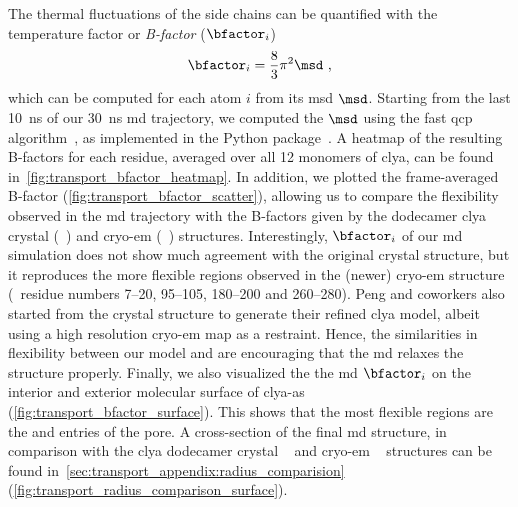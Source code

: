 The thermal fluctuations of the side chains can be quantified with the temperature factor or \emph{B-factor}
($\bfactor_i$)~\cite{Bahar-1997}
%
\begin{align}\label{eq:bfactor}
  \bfactor_i = \dfrac{8}{3} \pi^2 \msd \text{ ,}
\end{align}
%
which can be computed for each atom $i$ from its \gls{msd} $\msd$. Starting from the last \SI{10}{\ns} of our
\SI{30}{\ns} \gls{md} trajectory, we computed the $\msd$ using the fast \gls{qcp}
algorithm~\cite{Theobald-2005,Liu-2010}, as implemented in the  Python
package~\cite{MichaudAgrawal-2011}. A heatmap of the resulting B-factors for each residue, averaged over all
12 monomers of \gls{clya}, can be found in~\cref{fig:transport_bfactor_heatmap}. In addition, we plotted the
frame-averaged B-factor (\cref{fig:transport_bfactor_scatter}), allowing us to compare the flexibility
observed in the \gls{md} trajectory with the B-factors given by the dodecamer \gls{clya} crystal
(~\cite{Mueller-2009}) and \gls{cryo-em} (~\cite{Peng-2019}) structures.
Interestingly, $\bfactor_i$ of our \gls{md} simulation does not show much agreement with the original
 crystal structure, but it reproduces the more flexible regions observed in the (newer)
 \gls{cryo-em} structure (\ie~residue numbers \numrange{7}{20}, \numrange{95}{105},
\numrange{180}{200} and \numrange{260}{280}). Peng and coworkers also started from the  crystal
structure to generate their refined \gls{clya} model, albeit using a high resolution \gls{cryo-em} map as a
restraint. Hence, the similarities in flexibility between our model and  are encouraging that the
\gls{md} relaxes the structure properly. Finally, we also visualized the the \gls{md} $\bfactor_i$ on the
interior and exterior molecular surface of \gls{clya-as} (\cref{fig:transport_bfactor_surface}). This shows
that the most flexible regions are the \cisi{} and \transi{} entries of the pore. A cross-section of the final
\gls{md} structure, in comparison with the \gls{clya} dodecamer crystal ~\cite{Mueller-2009} and
\gls{cryo-em} ~\cite{Peng-2019} structures can be found
in~\cref{sec:transport_appendix:radius_comparision} (\cref{fig:transport_radius_comparison_surface}).


